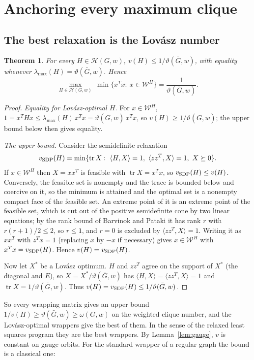 \documentclass[11pt]{article}
\newtheorem{thm}{Theorem}[section]
\theoremstyle{definition}
\theoremstyle{remark}
\newcommand{\Hc}{\mathcal{H}}
\newcommand{\Wc}{\mathcal{W}}
\newcommand{\lmax}{\lambda_{\max}}
\newcommand{\vt}{\vartheta(\bar G,w)}
\newcommand{\om}{\omega(G,w)}
\DeclareMathOperator{\tr}{tr}
\begin{document}
\section{Anchoring every maximum clique}
\label{sec:all}

\subsection{The best relaxation is the Lov\'asz number}

\begin{thm}
\label{thm:theta}
For every $H\in\Hc(G,w)$, $v(H)\leq 1/\vt$, with equality whenever
$\lmax(H)=\vt$. Hence
\[ \max_{H\in\Hc(G,w)}\ \min\{x^Tx:\ x\in\Wc^H\}=\frac{1}{\vt}. \]
\end{thm}
\begin{proof}
{\em Equality for Lov\'asz-optimal $H$.} For $x\in\Wc^H$,
$1=x^THx\leq\lmax(H)\,x^Tx=\vt\,x^Tx$, so $v(H)\geq1/\vt$; the upper bound
below then gives equality.

{\em The upper bound.} Consider the semidefinite relaxation
\[ v_{\rm SDP}(H)=\min\{\tr X:\ \langle H,X\rangle=1,\
\langle zz^T,X\rangle=1,\ X\succeq0\}. \]
If $x\in\Wc^H$ then $X=xx^T$ is feasible with $\tr X=x^Tx$, so
$v_{\rm SDP}(H)\leq v(H)$. Conversely, the feasible set is nonempty and the
trace is bounded below and coercive on it, so the minimum is attained and
the optimal set is a nonempty compact face of the feasible set. An extreme
point of it is an extreme point of the feasible set, which is cut out of
the positive semidefinite cone by two linear equations; by the rank bound
of Barvinok and Pataki \cite{Ba95,P98} it has rank $r$ with
$r(r+1)/2\leq2$, so $r\leq1$, and $r=0$ is excluded by
$\langle zz^T,X\rangle=1$. Writing it as $xx^T$ with $z^Tx=1$ (replacing $x$ by
$-x$ if necessary) gives $x\in\Wc^H$ with $x^Tx=v_{\rm SDP}(H)$. Hence
$v(H)=v_{\rm SDP}(H)$.

Now let $X^*$ be a Lov\'asz optimum. $H$ and $zz^T$ agree on the support of
$X^*$ (the diagonal and $E$), so $X=X^*/\vt$ has
$\langle H,X\rangle=\langle zz^T,X\rangle=1$ and $\tr X=1/\vt$. Thus
$v(H)=v_{\rm SDP}(H)\leq1/\vt$.
\end{proof}

So every wrapping matrix gives an upper bound $1/v(H)\geq\vt\geq\om$ on the
weighted clique number, and the Lov\'asz-optimal wrappers give the best of
them. In the sense of the relaxed least squares program they are the best
wrappers. By Lemma~\ref{lem:gauge}, $v$ is constant on gauge orbits. For
the standard wrapper of a regular graph the bound is a classical one:
\end{document}
